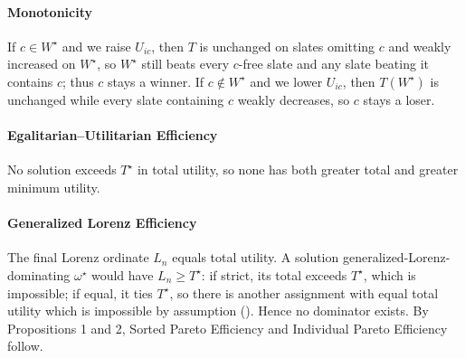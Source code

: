 \documentclass[11pt]{article}
\newcommand{\Pass}{\textcolor{green}{$\checkmark$}}
\begin{document}
\paragraph{Monotonicity} If $c\in W^\star$ and we raise $U_{ic}$, then $T$ is unchanged on slates omitting $c$ and weakly increased on $W^\star$, so $W^\star$ still beats every $c$-free slate and any slate beating it contains $c$; thus $c$ stays a winner. If $c\notin W^\star$ and we lower $U_{ic}$, then $T(W^\star)$ is unchanged while every slate containing $c$ weakly decreases, so $c$ stays a loser.

\paragraph{Egalitarian--Utilitarian Efficiency} No solution exceeds $T^\star$ in total utility, so none has both greater total and greater minimum utility.

\paragraph{Generalized Lorenz Efficiency} The final Lorenz ordinate $L_n$ equals total utility. A solution generalized-Lorenz-dominating $\omega^\star$ would have $L_n\ge T^\star$: if strict, its total exceeds $T^\star$, which is impossible; if equal, it ties $T^\star$, so there is another assignment with equal total utility which is impossible by assumption (). Hence no dominator exists. By Propositions 1 and 2, Sorted Pareto Efficiency and Individual Pareto Efficiency follow.



\end{document}
